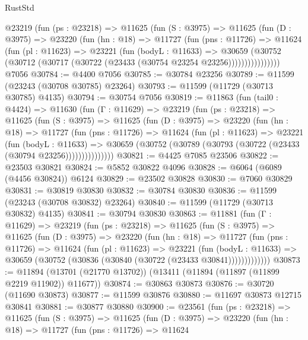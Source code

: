 \begin{lexlean}{RustStd}
\begin{coremodule}
        @23219
          (fun (ps : @23218) =>
          @11625
            (fun (S : @3975) =>
            @11625
              (fun (D : @3975) =>
              @23220
                (fun (hn : @18) =>
                @11727
                  (fun (pns : @11726) =>
                  @11624
                    (fun (pl : @11623) =>
                    @23221
                      (fun (bodyL : @11633) =>
                      @30659
                        (@30752
                          (@30712 (@30717 (@30722 (@23433 (@30754 @23254 @23256))))))))))))))))
    @7056
@30784 := @4400 @7056
@30785 := @30784 @23256
@30789 := @11599 (@23243 (@30708 @30785) @23264)
@30793 := @11599 (@11729 (@30713 @30785) @4135)
@30794 := @30754 @7056
@30819 := @11863
    (fun (tail0 : @4424) =>
    @11630
      (fun (Γ : @11629) =>
      @23219
        (fun (ps : @23218) =>
        @11625
          (fun (S : @3975) =>
          @11625
            (fun (D : @3975) =>
            @23220
              (fun (hn : @18) =>
              @11727
                (fun (pns : @11726) =>
                @11624
                  (fun (pl : @11623) =>
                  @23221
                    (fun (bodyL : @11633) =>
                    @30659 (@30752 (@30789 (@30793 (@30722 (@23433 (@30794 @23256)))))))))))))))
@30821 := @4425 @7085 @23506
@30822 := @23503 @30821
@30824 := @5852 @30822 @4096
@30828 := @6064 (@6089 (@4456 @30824)) @6124
@30829 := @23502 @30828
@30830 := @7060 @30829
@30831 := @30819 @30830
@30832 := @30784 @30830
@30836 := @11599 (@23243 (@30708 @30832) @23264)
@30840 := @11599 (@11729 (@30713 @30832) @4135)
@30841 := @30794 @30830
@30863 := @11881
    (fun (Γ : @11629) =>
    @23219
      (fun (ps : @23218) =>
      @11625
        (fun (S : @3975) =>
        @11625
          (fun (D : @3975) =>
          @23220
            (fun (hn : @18) =>
            @11727
              (fun (pns : @11726) =>
              @11624
                (fun (pl : @11623) =>
                @23221
                  (fun (bodyL : @11633) =>
                  @30659 (@30752 (@30836 (@30840 (@30722 (@23433 @30841)))))))))))))
@30873 := @11894 (@13701 (@21770 @13702)) (@13411 (@11894 (@11897 (@11899 @2219 @11902)) @11677))
@30874 := @30863 @30873
@30876 := @30720 (@11690 @30873)
@30877 := @11599 @30876
@30880 := @11697 @30873 @12715 @30841
@30881 := @30877 @30880
@30900 := @23561
    (fun (ps : @23218) =>
    @11625
      (fun (S : @3975) =>
      @11625
        (fun (D : @3975) =>
        @23220
          (fun (hn : @18) =>
          @11727
            (fun (pns : @11726) =>
            @11624

\end{coremodule}
\end{lexlean}
